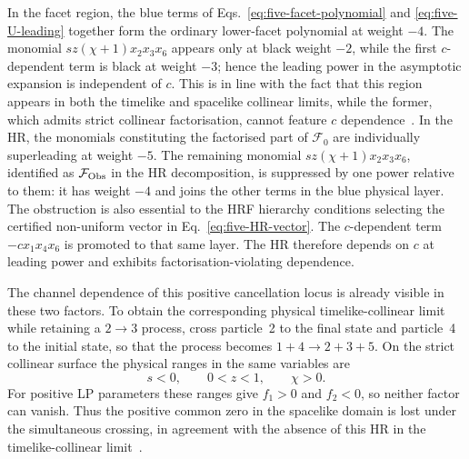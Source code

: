 \documentclass[a4paper,11pt]{article}
\newcommand{\FObs}{\mathcal F_{\rm Obs}}
\begin{document}
In the facet region, the blue terms of
Eqs.~\eqref{eq:five-facet-polynomial} and \eqref{eq:five-U-leading}
together form the ordinary lower-facet polynomial at weight \(-4\).  The
monomial \(sz(\chi+1)x_2x_3x_6\) appears only at black weight \(-2\), while
the first \(c\)-dependent term is black at weight \(-3\); hence the leading
power in the asymptotic expansion is independent of \(c\).  This is in line
with the fact that this region appears in both the timelike and spacelike
collinear limits, while the former, which admits strict collinear
factorisation, cannot feature \(c\) dependence~\cite{Chen:2026dnj}.  In the HR,
the monomials constituting the factorised part of \(\mathcal F_0\) are
individually superleading at weight \(-5\).  The remaining monomial
\(sz(\chi+1)x_2x_3x_6\), identified as \(\FObs\) in the HR decomposition, is
suppressed by one power relative to them: it has weight \(-4\) and joins the
other terms in the blue physical layer.  The obstruction is also essential to
the HRF hierarchy conditions selecting the certified non-uniform vector in
Eq.~\eqref{eq:five-HR-vector}.  The \(c\)-dependent
term \(-cx_1x_4x_6\) is promoted to that same layer.  The HR therefore depends
on \(c\) at leading power and exhibits factorisation-violating
dependence.

The channel dependence of this positive cancellation locus is already visible
in these two factors.  To obtain the corresponding physical timelike-collinear
limit while retaining a \(2\to3\) process, cross particle~2 to the final state
and particle~4 to the initial state, so that the process becomes
\(1+4\to2+3+5\).  On the strict collinear surface the physical ranges in the
same variables are
\begin{equation}
 s<0,\qquad 0<z<1,\qquad \chi>0.
 \label{eq:five-timelike-domain}
\end{equation}
For positive LP parameters these ranges give \(f_1>0\) and \(f_2<0\), so
neither factor can vanish.  Thus the positive common zero in the spacelike
domain is lost under the simultaneous crossing, in agreement with the absence
of this HR in the timelike-collinear limit~\cite{Chen:2026dnj}.
\end{document}

